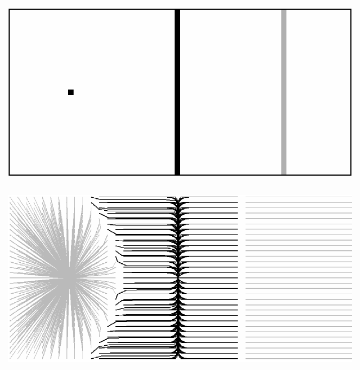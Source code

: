 \begin{figure}[!h]
   \begin{subfigure}[c]{.5\linewidth}
     \centering
     \includegraphics[scale=0.45]{Chapters/Images/synthetic_map.png}
     \caption{}
   \end{subfigure} 
   \begin{subfigure}[c]{.5\linewidth}
     \centering
     \includegraphics[scale=0.45]{Chapters/Images/synthetic_map_GVF.png}
     \caption{}
   \end{subfigure} \\
   

\end{figure}
